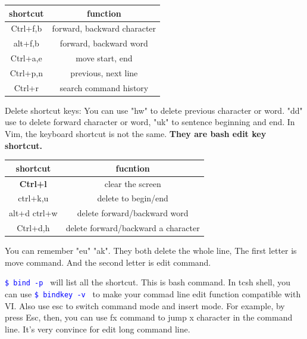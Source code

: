 \documentclass[paper=8.5in:11in, twoside, 12pt, pagesize=pdftex]{book}
\newcommand{\linuxcommand}[1]{\texttt{\textcolor{blue}{\$ #1 \Pisymbol{psy}{191}}}}
\begin{document}
\begin{center}
  \begin{tabular}{c|c}
 \hline shortcut & function \\
\hline Ctrl+f,b & forward, backward character \\
\hline alt+f,b & forward, backward word \\
\hline Ctrl+a,e & move start, end \\
\hline Ctrl+p,n & previous, next line \\
\hline Ctrl+r & search command history \\
 \hline
  \end{tabular}
\end{center}

Delete shortcut keys: You can use "hw" to delete previous character or word. "dd" use to delete forward character or word, "uk" to sentence beginning and end. In Vim, the keyboard shortcut is not the same. \textbf{They are bash edit key shortcut.}

\begin{center}
  \begin{tabular}{|c|c|}
 \hline shortcut & fucntion \\
 \hline \textbf{Ctrl+l} & clear the screen \\	
\hline ctrl+k,u & delete to begin/end \\
\hline alt+d ctrl+w & delete forward/backward word \\
\hline Ctrl+d,h  & delete forward/backward a character  \\
 \hline
  \end{tabular}
\end{center}

	You can remember "eu" "ak". They both delete the whole line, The first letter is move command. And the second letter is edit command. 

	\linuxcommand{bind -p} will list all the shortcut. This is bash command. In tcsh shell, you can use \linuxcommand{bindkey -v} to make your commad line edit function compatible with VI. Also use esc to switch command mode and insert mode. For example, by press Esc, then, you can use fx command to jump x character in the command line. It's very convince for edit long command line.
\end{document}
